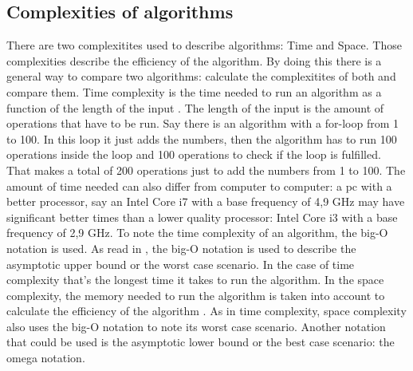 \subsection{Complexities of algorithms}
\label{subsec:Complexities}
There are two complexitites used to describe algorithms: Time and Space. Those complexities describe the efficiency of the algorithm. By doing this there is a general way to compare two algorithms: calculate the complexitites of both and compare them.
Time complexity is the time needed to run an algorithm as a function of the length of the input \autocite{Timecomp}. The length of the input is the amount of operations that have to be run. Say there is an algorithm with a for-loop from 1 to 100.
In this loop it just adds the numbers, then the algorithm has to run 100 operations inside the loop and 100 operations to check if the loop is fulfilled. That makes a total of 200 operations just to add the numbers from 1 to 100.
The amount of time needed can also differ from computer to computer: a pc with a better processor, say an Intel Core i7 with a base frequency of 4,9 GHz may have significant better times than a lower quality processor: Intel Core i3 with a base frequency of 2,9 GHz.
To note the time complexity of an algorithm, the big-O notation is used. As read in \textcite{Hidary_2019}, the big-O notation is used to describe the asymptotic upper bound or the worst case scenario. In the case of time complexity that's the longest time it takes to run the algorithm.
In the space complexity, the memory needed to run the algorithm is taken into account to calculate the efficiency of the algorithm \autocite{Abhishek2021Ruimte}. As in time complexity, space complexity also uses the big-O notation to note its worst case scenario. Another notation that could be used is the asymptotic lower bound or the best case scenario: the omega notation.
